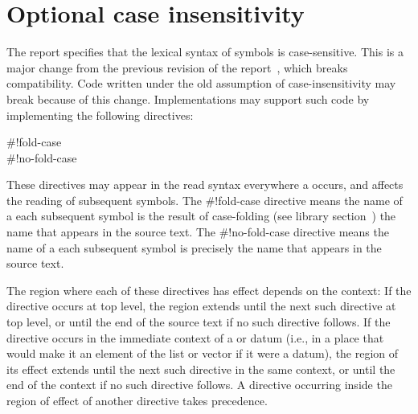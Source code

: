 \chapter{Optional case insensitivity}
\label{caseinsensitivityappendix}

The report specifies that the lexical syntax of symbols is
case-sensitive.  This is a major change from the previous revision of
the report~\cite{R5RS}, which breaks compatibility.  Code written
under the old assumption of case-insensitivity may break because of
this change.  Implementations may support such code by implementing
the following directives:

\begin{entry}{%
{\cf{}\#!fold-case}\\
{\cf{}\#!no-fold-case}}

These directives may appear in the read syntax everywhere a
 occurs, and affects the reading of subsequent symbols.
The {\cf{}\#!fold-case} directive means the name of a each subsequent
symbol is the result of case-folding (see library
section~) the name that appears in the
source text.  The {\cf{}\#!no-fold-case} directive means the name of a each
subsequent symbol is precisely the name that appears in the source text.

The region where each of these directives has effect depends on the
context: If the directive occurs at top level, the region extends
until the next such directive at top level, or until the end of the
source text if no such directive follows.  If the directive occurs in
the immediate context of a  or  datum (i.e.,
in a place that would make it an element of the list or vector if it
were a datum), the region of its effect extends until the next such
directive in the same context, or until the end of the context if no
such directive follows. A directive occurring inside the region of
effect of another directive takes precedence.
\end{entry}

